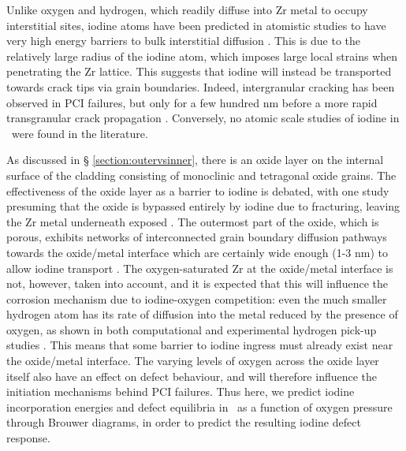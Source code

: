 Unlike oxygen and hydrogen, which readily diffuse into Zr metal to occupy interstitial sites, iodine atoms have been predicted in atomistic studies to have very high energy barriers to bulk interstitial diffusion \cite{rossi2015first,legris2005ab,carlot2002energetically}. This is due to the relatively large radius of the iodine atom, which imposes large local strains when penetrating the Zr lattice. This suggests that iodine will instead be transported towards crack tips via grain boundaries. Indeed, intergranular cracking has been observed in PCI failures, but only for a few hundred nm before a more rapid transgranular crack propagation \cite{fregonese2000failure, une1984threshold, wood1983effects, lunde1981stress, vilpponen1981fuel}. Conversely, no atomic scale studies of iodine in \zirconia\ were found in the literature.  

As discussed in § \ref{section:outervsinner}, there is an oxide layer on the internal surface of the cladding consisting of monoclinic and tetragonal oxide grains. The effectiveness of the oxide layer as a barrier to iodine is debated, with one study presuming that the oxide is bypassed entirely by iodine due to fracturing, leaving the Zr metal underneath exposed \cite{rossi2015first}. The outermost part of the oxide, which is porous, exhibits networks of interconnected grain boundary diffusion pathways towards the oxide/metal interface which are certainly wide enough (1-3 nm) to allow iodine transport \cite{ni2010porosity}. The oxygen-saturated Zr at the oxide/metal interface is not, however, taken into account, and it is expected that this will influence the corrosion mechanism due to iodine-oxygen competition: even the much smaller hydrogen atom has its rate of diffusion into the metal reduced by the presence of oxygen, as shown in both computational \cite{glazoff2014oxidation} and experimental hydrogen pick-up studies \cite{couet2014hydrogen}. This means that some barrier to iodine ingress must already exist near the oxide/metal interface. The varying levels of oxygen across the oxide layer itself also have an effect on defect behaviour, and will therefore influence the initiation mechanisms behind PCI failures. Thus here, we predict iodine incorporation energies and defect equilibria in \zirconia\ as a function of oxygen pressure through Brouwer diagrams, in order to predict the resulting iodine defect response.


%
%

